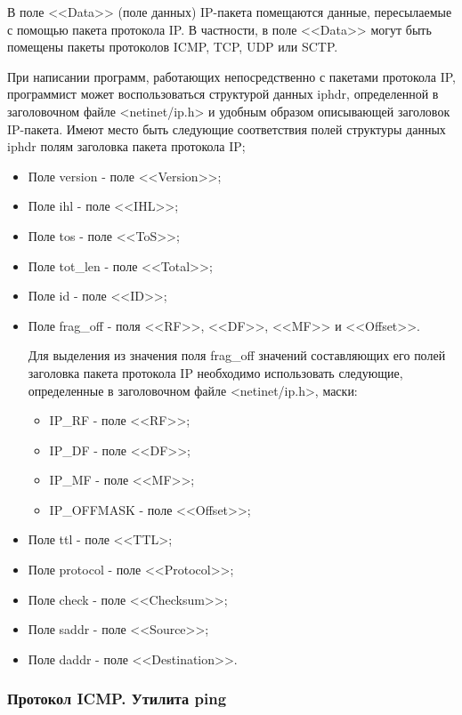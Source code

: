 	В поле <<Data>> (поле данных) IP-пакета помещаются данные, пересылаемые с помощью пакета протокола IP. В частности, в поле <<Data>> могут быть помещены
	пакеты протоколов ICMP, TCP, UDP или SCTP.

	При написании программ, работающих непосредственно с пакетами протокола IP, программист может
	воспользоваться структурой данных iphdr, определенной в заголовочном файле <netinet/ip.h> и удобным образом
	описывающей заголовок IP-пакета. Имеют место быть следующие соответствия полей структуры данных iphdr
	полям заголовка пакета протокола IP;

	\begin{itemize}

		\item Поле version - поле <<Version>>;
		\item Поле ihl - поле <<IHL>>;
		\item Поле tos - поле <<ToS>>;
		\item Поле tot\_len - поле <<Total>>;
		\item Поле id - поле <<ID>>;
		\item Поле frag\_off - поля <<RF>>, <<DF>>, <<MF>> и <<Offset>>.

			Для выделения из значения поля frag\_off значений составляющих его полей заголовка пакета протокола IP
			необходимо использовать следующие, определенные в заголовочном файле <netinet/ip.h>, маски:

				\begin{itemize}

					\item IP\_RF - поле <<RF>>;
					\item IP\_DF - поле <<DF>>;
					\item IP\_MF - поле <<MF>>;
					\item IP\_OFFMASK - поле <<Offset>>;

				\end{itemize}

		\item Поле ttl - поле <<TTL>;
		\item Поле protocol - поле <<Protocol>>;
		\item Поле check - поле <<Checksum>>;
		\item Поле saddr - поле <<Source>>;
		\item Поле daddr - поле <<Destination>>.

	\end{itemize}

\subsubsection{Протокол ICMP. Утилита ping}

